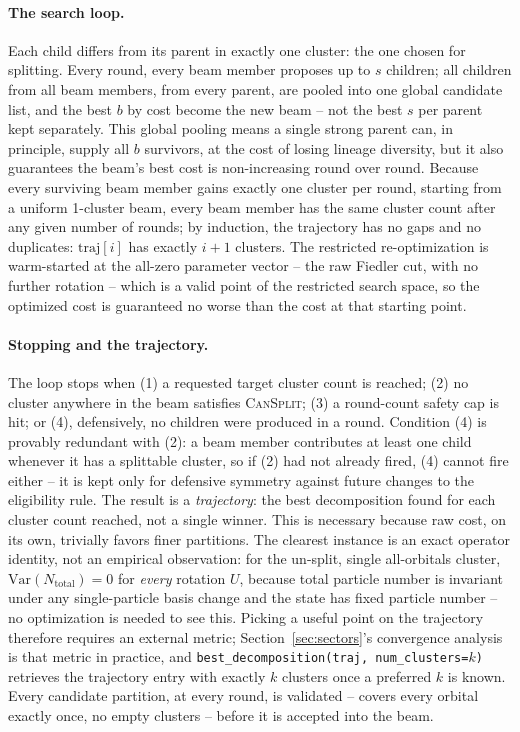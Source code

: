 \documentclass[10pt]{article}
\newcommand{\Var}{\mathrm{Var}}
\begin{document}
\paragraph{The search loop.} Each child differs from its parent in exactly one cluster: the one
chosen for splitting. Every round, every beam member proposes up to $s$ children; all children
from all beam members, from every parent, are pooled into one global candidate list, and the
best $b$ by cost become the new beam -- not the best $s$ per parent kept separately. This global
pooling means a single strong parent can, in principle, supply all $b$ survivors, at the cost of
losing lineage diversity, but it also guarantees the beam's best cost is non-increasing round
over round. Because every surviving beam member gains exactly one cluster per round, starting
from a uniform 1-cluster beam, every beam member has the same cluster count after any given
number of rounds; by induction, the trajectory has no gaps and no duplicates:
$\mathrm{traj}[i]$ has exactly $i+1$ clusters. The restricted re-optimization is warm-started at
the all-zero parameter vector -- the raw Fiedler cut, with no further rotation -- which is a
valid point of the restricted search space, so the optimized cost is guaranteed no worse than the
cost at that starting point.

\paragraph{Stopping and the trajectory.} The loop stops when (1) a requested target cluster
count is reached; (2) no cluster anywhere in the beam satisfies \textsc{CanSplit}; (3) a
round-count safety cap is hit; or (4), defensively, no children were produced in a round.
Condition (4) is provably redundant with (2): a beam member contributes at least one child
whenever it has a splittable cluster, so if (2) had not already fired, (4) cannot fire either --
it is kept only for defensive symmetry against future changes to the eligibility rule. The
result is a \emph{trajectory}: the best decomposition found for each cluster count reached, not
a single winner. This is necessary because raw cost, on its own, trivially favors finer
partitions. The clearest instance is an exact operator identity, not an empirical observation:
for the un-split, single all-orbitals cluster, $\Var(N_\mathrm{total})=0$ for \emph{every}
rotation $U$, because total particle number is invariant under any single-particle basis change
and the state has fixed particle number -- no optimization is needed to see this. Picking a
useful point on the trajectory therefore requires an external metric;
Section~\ref{sec:sectors}'s convergence analysis is that metric in practice, and
\texttt{best\_decomposition(traj, num\_clusters=$k$)} retrieves the trajectory entry with
exactly $k$ clusters once a preferred $k$ is known. Every candidate partition, at every round,
is validated -- covers every orbital exactly once, no empty clusters -- before it is accepted
into the beam.
\end{document}
